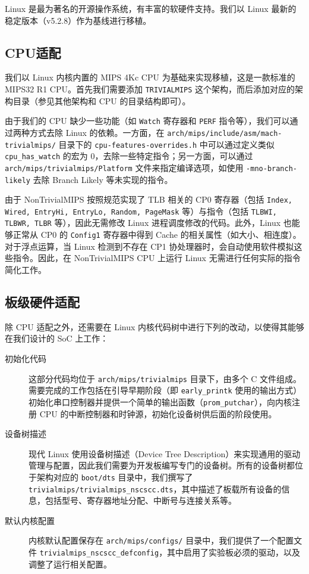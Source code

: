 Linux 是最为著名的开源操作系统，有丰富的软硬件支持。我们以 Linux 最新的稳定版本（v5.2.8）作为基线进行移植。

\subsection{CPU适配}

我们以 Linux 内核内置的 MIPS 4Kc CPU 为基础来实现移植，这是一款标准的 MIPS32 R1 CPU。首先我们需要添加 \texttt{TRIVIALMIPS} 这个架构，而后添加对应的架构目录（参见其他架构和 CPU 的目录结构即可）。

由于我们的 CPU 缺少一些功能（如 \texttt{Watch} 寄存器和 \texttt{PERF} 指令等），我们可以通过两种方式去除 Linux 的依赖。一方面，在 \texttt{arch/mips/include/asm/mach-trivialmips/} 目录下的 \texttt{cpu-features-overrides.h} 中可以通过定义类似 \texttt{cpu\_has\_watch} 的宏为 0，去除一些特定指令；另一方面，可以通过 \texttt{arch/mips/trivialmips/Platform} 文件来指定编译选项，如使用 \texttt{-mno-branch-likely} 去除 Branch Likely 等未实现的指令。

由于 NonTrivialMIPS 按照规范实现了 TLB 相关的 CP0 寄存器（包括 \texttt{Index, Wired, EntryHi, EntryLo, Random, PageMask} 等）与指令（包括 \texttt{TLBWI, TLBWR, TLBR} 等），因此无需修改 Linux 进程调度修改的代码。此外，Linux 也能够正常从 CP0 的 \texttt{Config1} 寄存器中得到 Cache 的相关属性（如大小、相连度）。对于浮点运算，当 Linux 检测到不存在 CP1 协处理器时，会自动使用软件模拟这些指令。因此，在 NonTrivialMIPS CPU 上运行 Linux 无需进行任何实际的指令简化工作。

\subsection{板级硬件适配}

除 CPU 适配之外，还需要在 Linux 内核代码树中进行下列的改动，以使得其能够在我们设计的 SoC 上工作：

\begin{description}
    \item[初始化代码] 这部分代码均位于 \texttt{arch/mips/trivialmips} 目录下，由多个 C 文件组成。需要完成的工作包括在引导早期阶段（即 \texttt{early\_printk} 使用的输出方式）初始化串口控制器并提供一个简单的输出函数（\texttt{prom\_putchar}），向内核注册 CPU 的中断控制器和时钟源，初始化设备树供后面的阶段使用。
    \item[设备树描述] 现代 Linux 使用设备树描述（Device Tree Description）来实现通用的驱动管理与配置，因此我们需要为开发板编写专门的设备树。所有的设备树都位于架构对应的 \texttt{boot/dts} 目录中，我们撰写了 \texttt{trivialmips/trivialmips\_nscscc.dts}，其中描述了板载所有设备的信息，包括型号、寄存器地址分配、中断号与连接关系等。
    \item[默认内核配置] 内核默认配置保存在 \texttt{arch/mips/configs/} 目录中，我们提供了一个配置文件 \texttt{trivialmips\_nscscc\_defconfig}，其中启用了实验板必须的驱动，以及调整了运行相关配置。
\end{description}

